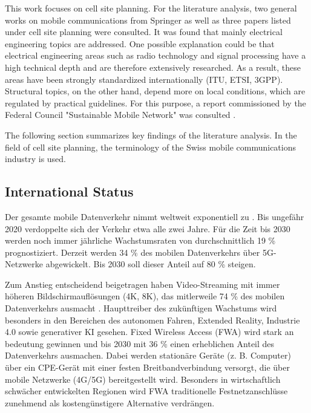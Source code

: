 \begin{English}
    This work focuses on cell site planning. For the literature analysis, two general works on mobile communications from Springer \cite{behnkeGrundkursMobilfunkUnd2022,jiangCellularCommunicationNetworks2024} as well as three papers listed under cell site planning \cite{engelsDimensioningCellSite2013,ahamed5GNetworkCoverage2021,huangAutomaticCellPlanning2000} were consulted. It was found that mainly electrical engineering topics are addressed. One possible explanation could be that electrical engineering areas such as radio technology and signal processing have a high technical depth and are therefore extensively researched. As a result, these areas have been strongly standardized internationally (ITU, ETSI, 3GPP). Structural topics, on the other hand, depend more on local conditions, which are regulated by practical guidelines. For this purpose, a report commissioned by the Federal Council "Sustainable Mobile Network" was consulted \cite{bundesratNachhaltigesMobilfunknetzBericht2022}.

    The following section summarizes key findings of the literature analysis. In the field of cell site planning, the terminology of the Swiss mobile communications industry is used.
\end{English}


\subsection{International Status}
\begin{German}
    Der gesamte mobile Datenverkehr nimmt weltweit exponentiell zu \cite{EricssonMobilityReport}. Bis ungefähr 2020 verdoppelte sich der Verkehr etwa alle zwei Jahre. Für die Zeit bis 2030 werden noch immer jährliche Wachstumsraten von durchschnittlich 19 \% prognostiziert. Derzeit werden 34 \% des mobilen Datenverkehrs über 5G-Netzwerke abgewickelt. Bis 2030 soll dieser Anteil auf 80 \% steigen.

    Zum Anstieg entscheidend beigetragen haben Video-Streaming mit immer höheren Bildschirmauflösungen (4K, 8K), das mitlerweile 74 \% des mobilen Datenverkehrs ausmacht \cite{EricssonMobilityReport}. Haupttreiber des zukünftigen Wachstums wird besonders in den Bereichen des autonomen Fahren, Extended Reality, Industrie 4.0 sowie generativer KI gesehen. 
    Fixed Wireless Access (FWA) wird stark an bedeutung gewinnen und bis 2030 mit 36 \% einen erheblichen Anteil des Datenverkehrs ausmachen. Dabei werden stationäre Geräte (z. B. Computer) über ein CPE-Gerät mit einer festen Breitbandverbindung versorgt, die über mobile Netzwerke (4G/5G) bereitgestellt wird. Besonders in wirtschaftlich schwächer entwickelten Regionen wird FWA traditionelle Festnetzanschlüsse zunehmend als kostengünstigere Alternative verdrängen. 
\end{German}

